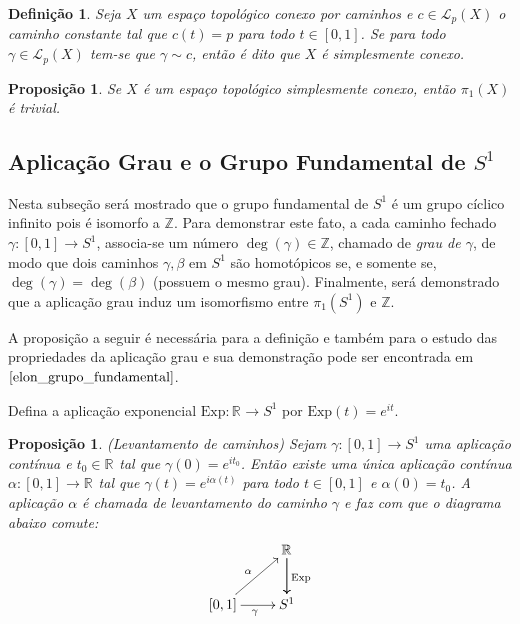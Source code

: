 \documentclass[12pt]{book}
\newtheorem{definicao}[teorema]{Definição}
\newtheorem{proposicao}[teorema]{Proposição}
\newcommand{\caminhos}{\mathcal{L}}
\newcommand{\caminhospontobasegeral}[2]{\caminhos_{#1}(#2)}
\newcommand{\circulo}{S^{1}}
\newcommand{\Exp}{\text{Exp}}
\newcommand{\grupofundamental}[1]{\pi_{1}(#1)}
\newcommand{\inteiros}{\mathbb{Z}}
\newcommand{\intervalo}{[0,1]}
\newcommand{\real}[1]{\mathbb{R}^{#1}}
\newcommand{\reta}{\real{}}
\begin{document}
	\begin{definicao}
		Seja $X$ um espaço topológico conexo por caminhos e
		$c \in \caminhospontobasegeral{p}{X}$ o caminho constante tal que $c(t) = p$ para todo $t \in \intervalo$. Se para todo $\gamma \in \caminhospontobasegeral{p}{X}$ tem-se que $\gamma \sim c$, então é dito que $X$ é simplesmente conexo.
	\end{definicao}
	
	\begin{proposicao}\label{proposicao_grupo_fundamental_simplesmente_conexo}
		Se $X$ é um espaço topológico simplesmente conexo, então $\grupofundamental{X}$ é trivial.
	\end{proposicao}
	
	\subsection{Aplicação Grau e o Grupo Fundamental de $\circulo$}
	Nesta subseção será mostrado que o grupo fundamental de $S^{1}$ é um grupo cíclico infinito pois é isomorfo a $\inteiros$. Para demonstrar este fato, a cada caminho fechado $\gamma:[0,1] \to S^{1}$, associa-se um número $\deg(\gamma) \in \inteiros$, chamado de \textit{grau de $\gamma$}, de modo que dois caminhos $\gamma, \beta$ em $S^{1}$ são homotópicos se, e somente se, $\deg(\gamma) = \deg(\beta)$ (possuem o mesmo grau). Finalmente, será demonstrado que a aplicação grau induz um isomorfismo entre $\pi_{1}(S^{1})$ e $\inteiros$.
	
	A proposição a seguir é necessária para a definição e também para o estudo das propriedades da aplicação grau e sua demonstração pode ser encontrada em $\cite{elon_grupo_fundamental}$.
	
	Defina a aplicação exponencial $\Exp: \reta\to \circulo$ por $\Exp(t) = e^{it}$.
	
	\begin{proposicao}\label{proposicao_levantamento_curvas}
		(Levantamento de caminhos) Sejam $\gamma:\intervalo \to S^{1}$ uma aplicação contínua e $t_{0}\in \real{}$ tal que $\gamma(0) = e^{it_{0}}$. Então existe uma única aplicação contínua $\alpha:\intervalo\to \real{}$ tal que $\gamma(t) = e^{i\alpha(t)}$ para todo $t\in \intervalo$ e $\alpha(0) = t_{0}$. A aplicação $\alpha$ é chamada de levantamento do caminho $\gamma$ e faz com que o diagrama abaixo comute:
		$$
		\xymatrix{
			& \real{}\ar[d]\ar[d]^{\Exp}
			\\
			\intervalo\ar[ur]^{\alpha} \ar[r]_{\gamma} & S^{1}
		}
		$$
	\end{proposicao}
	
\end{document}
